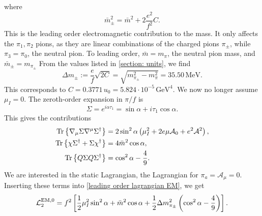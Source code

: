 %
where
\begin{equation}
    \bar m_\pm^2 = \bar m^2 + 2\frac{e^2}{f^2}C.
\end{equation}
%
This is the leading order electromagnetic contribution to the mass.
It only affects the $\pi_1, \pi_2$ pions, as they are linear combinations of the charged pions $\pi_\pm$, while $\pi_3 = \pi_0$, the neutral pion.
To leading order, $\bar m = m_\pi$, the neutral pion mass, and $\bar m_{\pm} = m_{\pi_{\pm}}$
From the values listed in \autoref{section: units}, we find
%
\begin{equation}
    \label{EM mass contribtuion leading order}
    \Delta m_{\pm} := \frac{e}{f}\sqrt{2C} = \sqrt{m_{\pi_\pm}^2 - m_{\pi}^2} = 35.50 \, \text{MeV}.
\end{equation}
%
This corresponds to $C = 0.3771 \, u_0 = 5.824 \cdot 10^{-5} \, \text{GeV}^4$.
We now no longer assume $\mu_I = 0$.
The zeroth-order expansion in $\pi/f$ is
%
\begin{equation}
    \Sigma = e^{i \alpha \tau_1} = \sin \alpha + i \tau_1 \cos \alpha.
\end{equation}
%
This gives the contributions
%
\begin{align}
    \text{Tr} \left\{ \nabla_\mu \Sigma \nabla^\mu \Sigma^\dagger \right\}
    & = 2 \sin^2\alpha\left(\mu_I^2 + 2 e \mu \mathcal A_0 + e^2\mathcal A^2 \right), \\
    \text{Tr} \left\{ \chi \Sigma^\dagger + \Sigma \chi^\dagger \right\}
    & =4 \bar m^2 \cos \alpha,\\
    \text{Tr} \left\{ Q \Sigma Q \Sigma^\dagger \right\}
    & =  \cos^2 \alpha - \frac{4}{9}.
\end{align}
%
We are interested in the static Lagrangian, the Lagrangian for $\pi_a = \mathcal A_\mu = 0$.
Inserting these terms into \autoref{leading order lagrangian EM}, we get
%
\begin{equation}
    \label{static lagrangian with EM}
    \mathcal{L}^{\text{EM}, 0}_2
    = f^2 \left[
        \frac{1}{2}\mu_I^2 \sin^2 \alpha + \bar m^2 \cos \alpha 
        + \frac{1}{2} \Delta m^2_{\pi_\pm} \left(\cos^2 \alpha - \frac{4}{9}\right)
    \right].
\end{equation}
%

